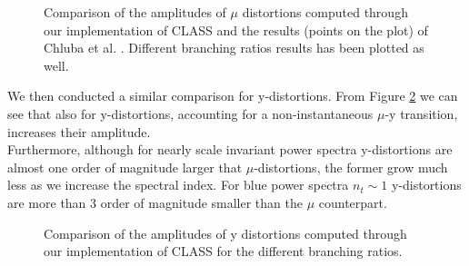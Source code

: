 \begin{figure}
    \centering
{}
\caption{Comparison of the amplitudes of $\mu$ distortions computed through our implementation of CLASS and the results (points on the plot) of Chluba et al. \cite{Chluba_tens_diss}. Different branching ratios results has been plotted as well. }
\label{fig:mu_amplitudes}
\end{figure}
We then conducted a similar comparison for y-distortions. From Figure \ref{fig:y_amplitudes} we can see that also for y-distortions, accounting for a non-instantaneous $\mu$-y transition, increases their amplitude.\\
Furthermore, although for nearly scale invariant power spectra y-distortions are almost one order of magnitude larger that $\mu$-distortions, the former grow much less as we increase the spectral index. For blue power spectra $n_t\sim 1$ y-distortions are more than 3 order of magnitude smaller than the $\mu$ counterpart.  
\begin{figure}
    \centering
{}
\caption{Comparison of the amplitudes of y distortions computed through our implementation of CLASS for the different branching ratios. }
\label{fig:y_amplitudes}
\end{figure}
